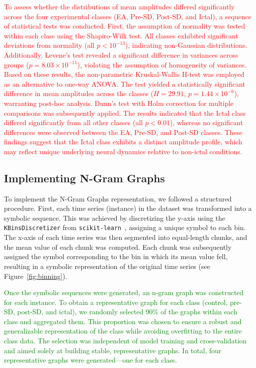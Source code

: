 \documentclass{article}
\begin{document}
\textcolor{red}{To assess whether the distributions of mean amplitudes differed significantly across the four experimental classes (EA, Pre-SD, Post-SD, and Ictal), a sequence of statistical tests was conducted. First, the assumption of normality was tested within each class using the Shapiro-Wilk test. All classes exhibited significant deviations from normality (all $p < 10^{-13}$), indicating non-Gaussian distributions. Additionally, Levene's test revealed a significant difference in variances across groups ($p = 8.03 \times 10^{-11}$), violating the assumption of homogeneity of variances. Based on these results, the non-parametric Kruskal-Wallis H-test was employed as an alternative to one-way ANOVA. The test yielded a statistically significant difference in mean amplitudes across the classes ($H = 29.91$, $p = 1.44 \times 10^{-6}$), warranting post-hoc analysis. Dunn’s test with Holm correction for multiple comparisons was subsequently applied. The results indicated that the Ictal class differed significantly from all other classes (all $p < 0.01$), whereas no significant differences were observed between the EA, Pre-SD, and Post-SD classes. These findings suggest that the Ictal class exhibits a distinct amplitude profile, which may reflect unique underlying neural dynamics relative to non-ictal conditions.}

\subsection{Implementing N-Gram Graphs}
To implement the N-Gram Graphs representation, we followed a structured procedure. First, each time series (instance) in the dataset was transformed into a symbolic sequence. This was achieved by discretizing the y-axis using the \texttt{KBinsDiscretizer} from \texttt{scikit-learn}~\cite{scikit-learn}, assigning a unique symbol to each bin. The x-axis of each time series was then segmented into equal-length chunks, and the mean value of each chunk was computed. Each chunk was subsequently assigned the symbol corresponding to the bin in which its mean value fell, resulting in a symbolic representation of the original time series (see Figure~\ref{fig:binning}).

\textcolor{green}{Once the symbolic sequences were generated, an n-gram graph was constructed for each instance. To obtain a representative graph for each class (control, pre-SD, post-SD, and ictal), we randomly selected 90\% of the graphs within each class and aggregated them. This proportion was chosen to ensure a robust and generalizable representation of the class while avoiding overfitting to the entire class data. The selection was independent of model training and cross-validation and aimed solely at building stable, representative graphs. In total, four representative graphs were generated—one for each class.}
\end{document}
